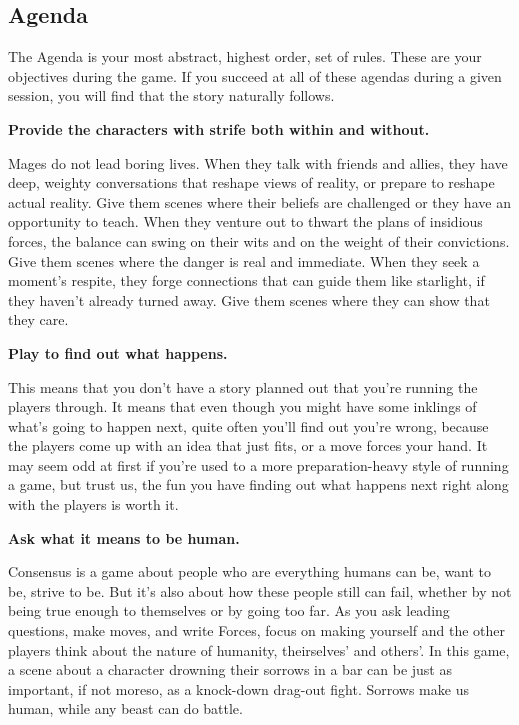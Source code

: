 \documentclass[
]{article}
\begin{document}
\hypertarget{agenda}{%
\subsection{Agenda}\label{agenda}}

The Agenda is your most abstract, highest order, set of rules. These are
your objectives during the game. If you succeed at all of these agendas
during a given session, you will find that the story naturally follows.

\textbf{Provide the characters with strife both within and without.}

Mages do not lead boring lives. When they talk with friends and allies,
they have deep, weighty conversations that reshape views of reality, or
prepare to reshape actual reality. Give them scenes where their beliefs
are challenged or they have an opportunity to teach. When they venture
out to thwart the plans of insidious forces, the balance can swing on
their wits and on the weight of their convictions. Give them scenes
where the danger is real and immediate. When they seek a moment's
respite, they forge connections that can guide them like starlight, if
they haven't already turned away. Give them scenes where they can show
that they care.

\textbf{Play to find out what happens.}

This means that you don't have a story planned out that you're running
the players through. It means that even though you might have some
inklings of what's going to happen next, quite often you'll find out
you're wrong, because the players come up with an idea that just fits,
or a move forces your hand. It may seem odd at first if you're used to a
more preparation-heavy style of running a game, but trust us, the fun
you have finding out what happens next right along with the players is
worth it.

\textbf{Ask what it means to be human.}

Consensus is a game about people who are everything humans can be, want
to be, strive to be. But it's also about how these people still can
fail, whether by not being true enough to themselves or by going too
far. As you ask leading questions, make moves, and write Forces, focus
on making yourself and the other players think about the nature of
humanity, theirselves' and others'. In this game, a scene about a
character drowning their sorrows in a bar can be just as important, if
not moreso, as a knock-down drag-out fight. Sorrows make us human, while
any beast can do battle.
\end{document}
